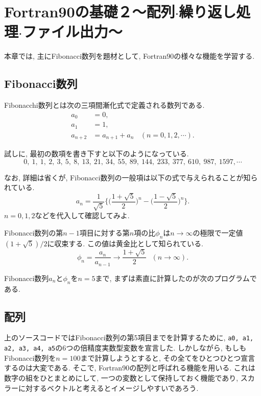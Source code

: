 \chapter{Fortran90の基礎２〜配列$\cdot$繰り返し処理$\cdot$ファイル出力〜}

本章では, 主にFibonacci数列を題材として, Fortran90の様々な機能を学習する.

\section{Fibonacci数列}
Fibonacchi数列とは次の三項間漸化式で定義される数列である.
\begin{equation}
\begin{split}
a_0&=0, \\
a_1&=1, \\
a_{n+2}&=a_{n+1}+a_{n} \ \ \ \ (n=0, 1, 2, \cdots).
\end{split}
\end{equation}

試しに, 最初の数項を書き下すと以下のようになっている.
\[
0, \ 1, \ 1, \ 2, \ 3, \ 5, \ 8, \ 13, \ 21, \ 34, \ 55, \ 89, \ 144, \ 233, \ 377, \ 610, \ 987, \ 1597, \cdots
\]

なお, 詳細は省くが, Fibonacci数列の一般項は以下の式で与えられることが知られている.
\begin{equation}
a_n=\frac{1}{\sqrt{5}} \Bigg\{ \Bigg( \frac{1+\sqrt{5}}{2}\Bigg)^n- \Bigg( \frac{1-\sqrt{5}}{2}\Bigg)^n \Bigg\}.
\end{equation}
$n=0, 1, 2$などを代入して確認してみよ.


Fibonacci数列の第$n-1$項目に対する第$n$項の比$\phi_n$は$n\to \infty$の極限で一定値$(1+\sqrt{5})/2$に収束する.
この値は黄金比として知られている.
\begin{equation}
\phi_n = \frac{a_n}{a_{n-1}} \to \frac{1+\sqrt{5}}{2} \ \ \ (n \to \infty).
\end{equation}

Fibonacci数列$a_n$と$\phi_n$を$n=5$まで, まずは素直に計算したのが次のプログラムである.




\section{配列}
上のソースコードではFibonacci数列の第5項目までを計算するために,
\verb|a0, a1, a2, a3, a4, a5|の6つの倍精度実数型変数を宣言した.
しかしながら, もしもFibonacci数列を$n=100$まで計算しようとすると,
その全てをひとつひとつ宣言するのは大変である.
そこで, Fortran90の配列と呼ばれる機能を用いる.
これは数字の組をひとまとめにして, 一つの変数として保持しておく機能であり,
スカラーに対するベクトルと考えるとイメージしやすいであろう.

